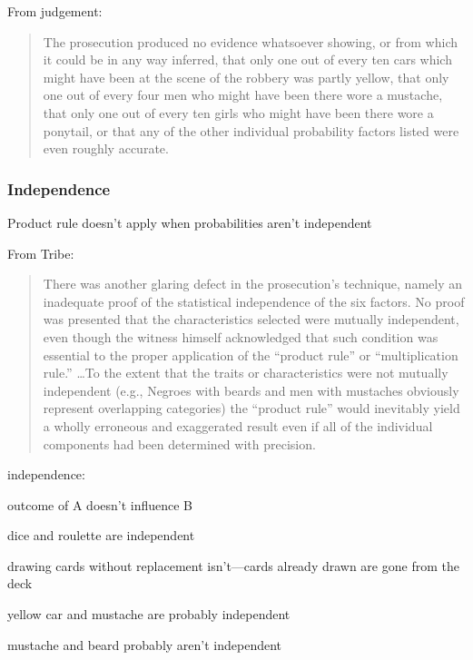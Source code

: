 \documentclass[letterpaper, landscape]{exam}
\begin{document}
  From judgement:
  \begin{quote}
    \begin{em}
      The prosecution produced no evidence whatsoever showing, or from which it
      could be in any way inferred, that only one out of every ten cars which
      might have been at the scene of the robbery was partly yellow, that only
      one out of every four men who might have been there wore a mustache, that
      only one out of every ten girls who might have been there wore a
      ponytail, or that any of the other individual probability factors listed
      were even roughly accurate.
    \end{em}
  \end{quote}

  \subsubsection{Independence}
  Product rule doesn't apply when probabilities aren't independent

  From Tribe:
  \begin{quote}
    \begin{em}
      There was another glaring defect in the prosecution’s technique, namely an
      inadequate proof of the statistical independence of the six factors. No
      proof was presented that the characteristics selected were mutually
      independent, even though the witness himself acknowledged that such
      condition was essential to the proper application of the ``product rule''
      or ``multiplication rule.'' \dots To the extent that the traits or
      characteristics were not mutually independent (e.g., Negroes with beards
      and men with mustaches obviously represent overlapping categories) the
      ``product rule'' would inevitably yield a wholly erroneous and exaggerated
      result even if all of the individual components had been determined with
      precision.
    \end{em}
  \end{quote}

  independence:
  \begin{itemize*}
    \item outcome of A doesn't influence B
    \item dice and roulette are independent
    \item drawing cards without replacement isn't---cards already drawn are gone
      from the deck
    \item yellow car and mustache are probably independent
    \item mustache and beard probably aren't independent
  \end{itemize*}
\end{document}

